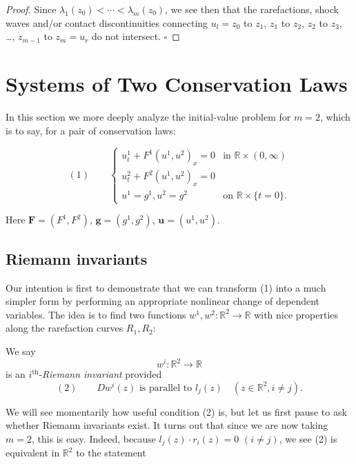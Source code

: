 \begin{proof}
Since $\lambda_1(z_0)<\cdots<\lambda_m(z_0)$, we see then that the rarefactions, shock waves and/or contact discontinuities connecting $u_l=z_0$ to $z_1$, $z_1$ to $z_2$, $z_2$ to $z_3$, \ldots, $z_{m-1}$ to $z_m=u_r$ do not intersect. $\square$
\end{proof}

\section{Systems of Two Conservation Laws}\label{sec:systems-two-conservation-laws}

In this section we more deeply analyze the initial-value problem for $m=2$, which is to say, for a pair of conservation laws:

$$(1) \qquad \begin{cases} u^1_t + F^1(u^1,u^2)_x = 0 & \text{in } \mathbb{R}\times(0,\infty) \\ u^2_t + F^2(u^1,u^2)_x = 0 \\ u^1=g^1, u^2=g^2 & \text{on } \mathbb{R}\times\{t=0\}. \end{cases}$$

Here $\mathbf{F}=(F^1,F^2)$, $\mathbf{g}=(g^1,g^2)$, $\mathbf{u}=(u^1,u^2)$.

\subsection{Riemann invariants}\label{sec:riemann-invariants}

Our intention is first to demonstrate that we can transform (1) into a much simpler form by performing an appropriate nonlinear change of dependent variables. The idea is to find two functions $w^1,w^2:\mathbb{R}^2\to\mathbb{R}$ with nice properties along the rarefaction curves $R_1,R_2$:

\begin{definition}
\label{def:riemann-invariant}
We say
$$w^i:\mathbb{R}^2\to\mathbb{R}$$
is an $i^{\text{th}}$-\textit{Riemann invariant} provided
$$(2) \qquad Dw^i(z) \text{ is parallel to } l_j(z) \quad (z\in\mathbb{R}^2, i\neq j).$$
\end{definition}

We will see momentarily how useful condition (2) is, but let us first pause to ask whether Riemann invariants exist. It turns out that since we are now taking $m=2$, this is easy. Indeed, because $l_j(z)\cdot r_i(z)=0$ $(i\neq j)$, we see (2) is equivalent in $\mathbb{R}^2$ to the statement


